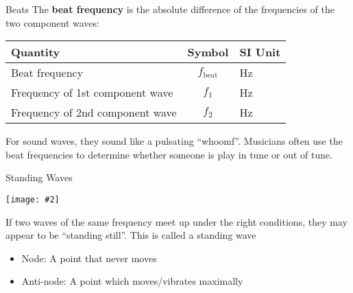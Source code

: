 \documentclass[12pt,aspectratio=169]{beamer}
\newcommand{\pic}[2]{\texttt{[image: \#2]}}
\newcommand{\eq}[2]{\vspace{#1}{\Large\begin{displaymath}#2\end{displaymath}}}
\begin{document}
\begin{frame}{Beats}
  The \textbf{beat frequency} is the absolute difference of the frequencies of
  the two component waves:

  \eq{-.2in}{
    \boxed{f_\text{beat}=|f_1-f_2|}
  }
  \begin{center}
    \begin{tabular}{l|c|l}
      \rowcolor{pink}
      \textbf{Quantity} & \textbf{Symbol} & \textbf{SI Unit} \\ \hline
      Beat frequency     & $f_\text{beat}$    & \si\hertz \\
      Frequency of 1st component wave & $f_1$ & \si\hertz \\
      Frequency of 2nd component wave & $f_2$ & \si\hertz
    \end{tabular}
  \end{center}
  For sound waves, they sound like a pulsating ``whoomf''. Musicians often use
  the beat frequencies to determine whether someone is play in tune or out of
  tune.
\end{frame}



\begin{frame}{Standing Waves}
  \begin{center}
    \pic{.6}{standing-wave-3}
  \end{center}
  If two waves of the same frequency meet up under the right conditions, they
  may appear to be ``standing still''. This is called a standing wave
  \begin{itemize}
  \item Node: A point that never moves
  \item Anti-node: A point which moves/vibrates maximally
  \end{itemize}
\end{frame}
\end{document}
